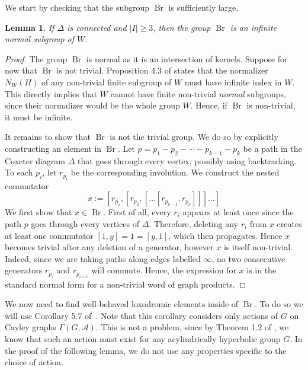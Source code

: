 \documentclass[10pt,a4paper]{amsart}
\newtheorem{lemma}[prop]{Lemma}
\newcommand{\Br}{\operatorname{Br}}
\begin{document}
We start by checking that the subgroup $\Br$ is sufficiently large.

\begin{lemma}\label{lem:Binfinite}
    If $\Delta$ is connected and $|I| \geq 3$, then the group $\Br$ is an infinite normal subgroup of $W$.
\end{lemma}

\begin{proof}
    The group $\Br$ is normal as it is an intersection of kernels. Suppose for now that $\Br$ is not trivial. Proposition 4.3 of \cite{ParisCoxeter} states that the normalizer $N_W(H)$ of any non-trivial finite subgroup of $W$ must have infinite index in $W$. This directly implies that $W$ cannot have finite non-trivial \emph{normal} subgroups, since their normalizer would be the whole group $W$. Hence, if $\Br$ is non-trivial, it must be infinite.
    
    It remains to show that $\Br$ is not the trivial group. We do so by explicitly constructing an element in $\Br$. Let $ p =p_1-p_2-\cdots-p_{k-1}-p_k$ be a path in the Coxeter diagram $\Delta$ that goes through every vertex, possibly using backtracking. To each $p_i$, let $r_{p_i}$ be the corresponding involution. We construct the nested commutator
    \[
    x := [r_{p_1},[r_{p_2},[\ldots [r_{p_{k-1}},r_{p_k}]]]\ldots]
    \]
    We first show that $x \in \Br$. First of all, every $r_i$ appears at least once since the path $p$ goes through every vertices of $\Delta$. Therefore, deleting any $r_i$ from $x$ creates at least one commutator $[1,y] = 1 = [y,1]$, which then propagates. Hence $x$ becomes trivial after any deletion of a generator, however $x$ is itself non-trivial. Indeed, since we are taking paths along edges labelled $\infty$, no two consecutive generators $r_{p_i}$ and $r_{p_{i+1}}$ will commute. Hence, the expression for $x$ is in the standard normal form for a non-trivial word of graph products.
    
\end{proof}

We now need to find well-behaved loxodromic elements inside of $\Br$. To do so we will use Corollary 5.7 of~\cite{hull2017small}. Note that this corollary considers only actions of $G$ on Cayley graphs $\Gamma(G,\mathcal{A})$. This is not a problem, since by Theorem 1.2 of \cite{OsinAcylindrical}, we know that such an action must exist for any acylindrically hyperbolic group $G$. In the proof of the following lemma, we do not use any properties specific to the choice of action. 
\end{document}
